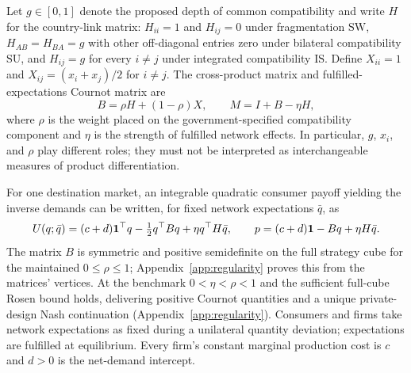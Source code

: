 \documentclass[11pt,a4paper]{article}
\theoremstyle{remark}\newtheorem{remark}[theorem]{Remark}
\newcommand{\SW}{\mathrm{SW}}\newcommand{\SU}{\mathrm{SU}}\newcommand{\IS}{\mathrm{IS}}
\begin{document}
Let $g\in[0,1]$ denote the proposed depth of common compatibility and write $H$ for the country-link matrix: $H_{ii}=1$ and $H_{ij}=0$ under fragmentation $\SW$, $H_{AB}=H_{BA}=g$ with other off-diagonal entries zero under bilateral compatibility $\SU$, and $H_{ij}=g$ for every $i\ne j$ under integrated compatibility $\IS$. Define $X_{ii}=1$ and $X_{ij}=(x_i+x_j)/2$ for $i\ne j$. The cross-product matrix and fulfilled-expectations Cournot matrix are
\begin{equation}\label{eq:matrices}
B=\rho H+(1-\rho)X,\qquad M=I+B-\eta H,
\end{equation}
where $\rho$ is the weight placed on the government-specified compatibility component and $\eta$ is the strength of fulfilled network effects. In particular, $g$, $x_i$, and $\rho$ play different roles; they must not be interpreted as interchangeable measures of product differentiation.

For one destination market, an integrable quadratic consumer payoff yielding the inverse demands can be written, for fixed network expectations $\bar{q}$, as
\begin{equation}\label{eq:consumer}
U(q;\bar q)=(c+d)\boldsymbol{1}^{\top}q-\tfrac12q^{\top}Bq+\eta q^{\top}H\bar q,\qquad
p=(c+d)\boldsymbol{1}-Bq+\eta H\bar q.
\end{equation}
The matrix $B$ is symmetric and positive semidefinite on the full strategy cube for the maintained $0\le\rho\le1$; Appendix~\ref{app:regularity} proves this from the matrices' vertices. At the benchmark $0<\eta<\rho<1$ and the sufficient full-cube Rosen bound holds, delivering positive Cournot quantities and a unique private-design Nash continuation (Appendix~\ref{app:regularity}). Consumers and firms take network expectations as fixed during a unilateral quantity deviation; expectations are fulfilled at equilibrium. Every firm's constant marginal production cost is $c$ and $d>0$ is the net-demand intercept.
\end{document}
